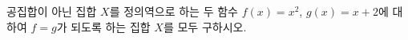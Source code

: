 \hspace*{2mm}\begin{minipage}[t]{\dimexpr\linewidth-2mm\relax}\vspace{0pt}
공집합이 아닌 집합 $X$를 정의역으로 하는 두 함수 $f(x)=x^2$, $g(x)=x+2$에 대하여 $f=g$가 되도록 하는 집합 $X$를 모두 구하시오.\end{minipage}
